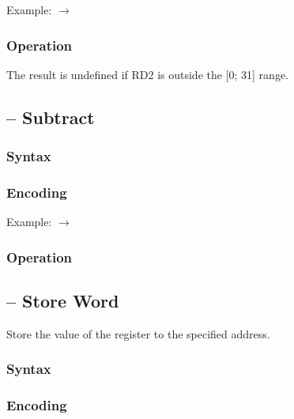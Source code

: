 \documentclass[a4paper,12pt,twoside,extrafontsizes]{memoir}
\begin{document}
{Example:  $\rightarrow$ 

\subsubsection{Operation}


The result is undefined if RD2 is outside the [0; 31] range.

\subsection{ -- Subtract}
\label{subsec:instr:sub}

\subsubsection{Syntax}


\subsubsection{Encoding}


Example:  $\rightarrow$ 

\subsubsection{Operation}


\subsection{ -- Store Word}
\label{subsec:instr:sw}

Store the value of the register to the specified address.

\subsubsection{Syntax}


\subsubsection{Encoding}

}
\end{document}
